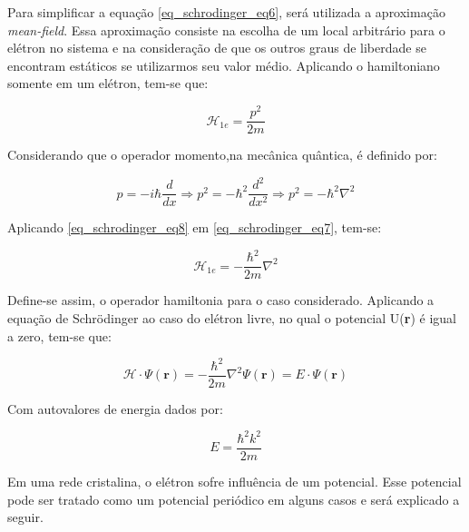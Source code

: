       \par Para simplificar a equação \eqref{eq_schrodinger_eq6}, será utilizada a aproximação \textit{mean-field}\cite{qm_fis10}. Essa aproximação consiste na escolha de um local arbitrário para o elétron no sistema e na consideração de que os outros graus de liberdade se encontram estáticos se utilizarmos seu valor médio. Aplicando o hamiltoniano somente em um elétron, tem-se que:

      \begin{equation}\label{eq_schrodinger_eq7}
        \mathcal{H}_{1e} = \frac{p^2}{2m}
      \end{equation}

      Considerando que o operador momento,na mecânica quântica, é definido por\cite{qm_fis11}:

      \begin{equation}\label{eq_schrodinger_eq8}
        p = -i\hbar\frac{d}{dx} \Longrightarrow
        p^2 = -\hbar^2 \frac{d^2}{dx^2} \Longrightarrow
        p^2 = -\hbar^2 \nabla^2
      \end{equation}

      Aplicando \eqref{eq_schrodinger_eq8} em \eqref{eq_schrodinger_eq7}, tem-se:

      \begin{equation}\label{eq_schrodinger_eq9}
        \mathcal{H}_{1e} = - \frac{\hbar^2}{2m}\nabla^2
      \end{equation}

      Define-se assim, o operador hamiltonia para o caso considerado. Aplicando a equação de Schrödinger ao caso do elétron livre, no qual o potencial U(\textbf{r}) é igual a zero, tem-se que:

      \begin{equation}\label{eq_schrodinger_eq10}
        \mathcal{H} \cdot \Psi(\mathbf{r}) =
          -\frac{\hbar^2}{2m} \nabla^2 \Psi(\mathbf{r}) =
          E \cdot \Psi(\mathbf{r})
      \end{equation}

      Com autovalores de energia dados por:

      \begin{equation}\label{eq_schrodinger_autovalores}
        E = \frac{\hbar^2 k^2}{2m}
      \end{equation}

      Em uma rede cristalina, o elétron sofre influência de um potencial. Esse potencial pode ser tratado como um potencial periódico\cite{qm_fis5} em alguns casos e será explicado a seguir.
